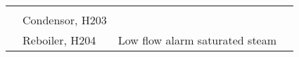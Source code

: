 \begin{table}[h]
\begin{tabular}{@{}llll@{}}
     &                                            &                                                                                                                                                               &                                                                                                                                                                                                                                                         \\ \cmidrule(l){2-4} 
     & \multirow{3}{*}{Condensor, H203}           &                                                                                                                                                               &                                                                                                                                                                                                                                                         \\ \cmidrule(l){3-4} 
     &                                            &                                                                                                                                                               &                                                                                                                                                                                                                                                         \\ \cmidrule(l){3-4} 
     &                                            &                                                                                                                                                               &                                                                                                                                                                                                                                                         \\ \cmidrule(l){2-4} 
     & Reboiler, H204                             & Low flow alarm saturated steam                                                                                                                                &                                                                                                                                                                                                                                                         \\ \bottomrule
\end{tabular}%
\end{table}
